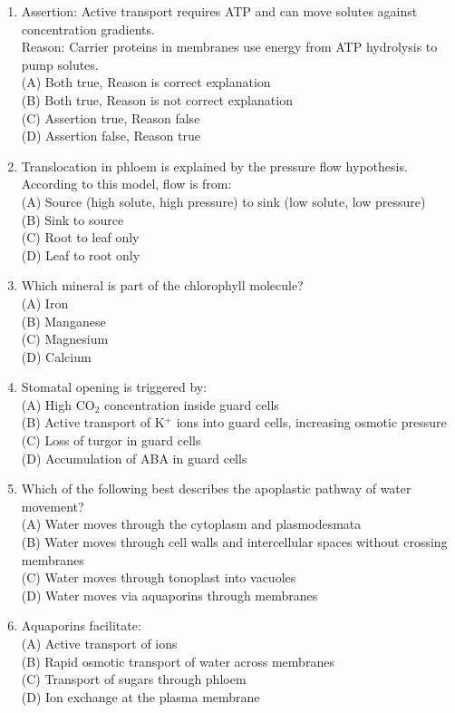 \documentclass{article}
\begin{document}
\begin{enumerate}[label=Q\arabic*.]
\item Assertion: Active transport requires ATP and can move solutes against concentration gradients.\\
Reason: Carrier proteins in membranes use energy from ATP hydrolysis to pump solutes.
\\(A) Both true, Reason is correct explanation
\\(B) Both true, Reason is not correct explanation
\\(C) Assertion true, Reason false
\\(D) Assertion false, Reason true

\item Translocation in phloem is explained by the pressure flow hypothesis. According to this model, flow is from:
\\(A) Source (high solute, high pressure) to sink (low solute, low pressure)
\\(B) Sink to source
\\(C) Root to leaf only
\\(D) Leaf to root only

\item Which mineral is part of the chlorophyll molecule?
\\(A) Iron
\\(B) Manganese
\\(C) Magnesium
\\(D) Calcium

\item Stomatal opening is triggered by:
\\(A) High CO$_2$ concentration inside guard cells
\\(B) Active transport of K$^+$ ions into guard cells, increasing osmotic pressure
\\(C) Loss of turgor in guard cells
\\(D) Accumulation of ABA in guard cells

\item Which of the following best describes the apoplastic pathway of water movement?
\\(A) Water moves through the cytoplasm and plasmodesmata
\\(B) Water moves through cell walls and intercellular spaces without crossing membranes
\\(C) Water moves through tonoplast into vacuoles
\\(D) Water moves via aquaporins through membranes

\item Aquaporins facilitate:
\\(A) Active transport of ions
\\(B) Rapid osmotic transport of water across membranes
\\(C) Transport of sugars through phloem
\\(D) Ion exchange at the plasma membrane


\end{enumerate}
\end{document}
